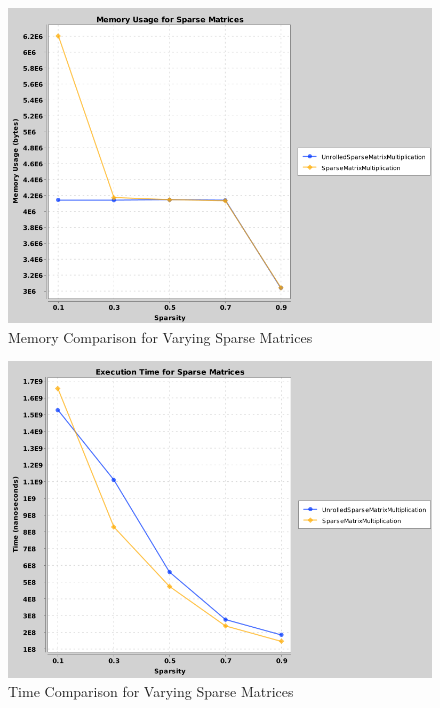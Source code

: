 \documentclass{article}
\begin{document}
\begin{figure}[h]
    \centering
    \includegraphics[width=\textwidth]{sparce_memory_comparison.png}
    \caption{Memory Comparison for Varying Sparse Matrices}
\end{figure}

\begin{figure}[h]
    \centering
    \includegraphics[width=\textwidth]{sparce_time_comparison.png}
    \caption{Time Comparison for Varying Sparse Matrices}
\end{figure}
\end{document}
